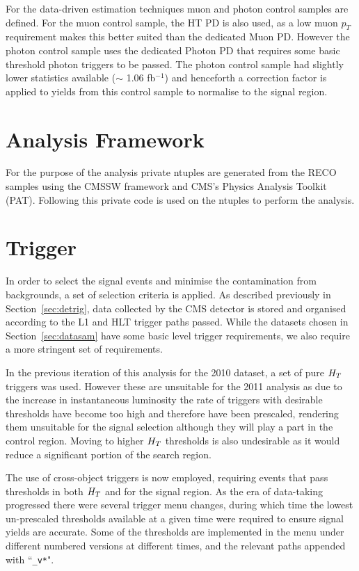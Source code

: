 For the data-driven estimation techniques muon and photon control samples are defined. For the muon control sample, the HT PD is also used, as a low muon $p_{T}$ requirement makes this better suited than the dedicated Muon PD. However the photon control sample uses the dedicated Photon PD that requires some basic threshold photon triggers to be passed. The photon control sample had slightly lower statistics available ($\sim$ 1.06 fb$^{-1}$) and henceforth a correction factor is applied to yields from this control sample to normalise to the signal region.


\section{Analysis Framework}

For the purpose of the analysis private ntuples are generated from the RECO samples using the CMSSW framework and CMS's Physics Analysis Toolkit (PAT). Following this private code is used on the ntuples to perform the analysis.



\section{Trigger}
\label{sec:trig}
In order to select the signal events and minimise the contamination from backgrounds, a set of selection criteria is applied. As described previously in Section~\ref{sec:detrig}, data collected by the CMS detector is stored and organised according to the L1 and HLT trigger paths passed. While the datasets chosen in Section~\ref{sec:datasam} have some basic level trigger requirements, we also require a more stringent set of requirements.


In the previous iteration of this analysis for the 2010 dataset, a set of pure $H_{T}$ triggers was used. However these are unsuitable for the 2011 analysis as due to the increase in instantaneous luminosity the rate of triggers with desirable thresholds have become too high and therefore have been prescaled, rendering them unsuitable for the signal selection although they will play a part in the control region. Moving to higher $H_{T}$ thresholds is also undesirable as it would reduce a significant portion of the search region.

The use of cross-object triggers is now employed, requiring events that pass thresholds in both $H_{T}$ and \mht for the signal region. As the era of data-taking progressed there were several trigger menu changes, during which time the lowest un-prescaled thresholds available at a given time were required to ensure signal yields are accurate. Some of the thresholds are implemented in the menu under different numbered versions at different times, and the relevant paths appended with ``\verb!_v*!".

